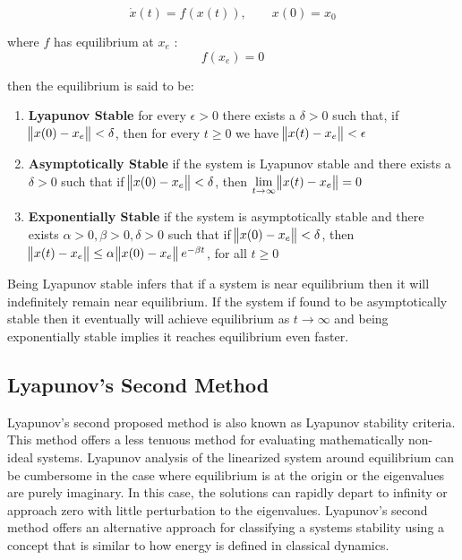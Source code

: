  \begin{equation}
\dot{x}(t)=f(x(t)), \qquad x(0)=x_0
\end{equation}

where $f$ has equilibrium at $x_e$ :
 \begin{equation}
f(x_e) = 0
\end{equation}

then the equilibrium is said to be:
\begin{enumerate}
	\item \textbf{Lyapunov Stable} \newline
	for every $\epsilon > 0$ there exists a $\delta > 0$ such that, if \: $\norm{x(0) - x_e} < \delta$, then for every $t \geq 0$ we have 	$ \norm{x(t) - x_e} < \epsilon$	
	\item \textbf{Asymptotically Stable} \newline
	if the system is Lyapunov stable and there exists a $\delta > 0$ such that if \: $\norm{x(0) - x_e}  < \delta$, then $\displaystyle \lim_{t\to \infty} \norm{x(t)-x_e} =0$
	\item \textbf{Exponentially Stable} \newline
	if the system is asymptotically stable and there exists $\alpha > 0, \beta > 0, \delta > 0$ such that if $\norm{x(0)-x_e}<\delta$, then \:$\norm{x(t)-x_e} \leq \alpha \norm{x(0)-x_e} e^{-\beta t}$, for all $t \geq 0$
\end{enumerate}

Being Lyapunov stable infers that if a system is near equilibrium then it will indefinitely remain near equilibrium.  If the system if found to be asymptotically stable then it eventually will achieve equilibrium as $t\to \infty$ and being exponentially stable implies it reaches equilibrium even faster.

\subsection{Lyapunov's Second Method}
 
Lyapunov's second proposed method is also known as Lyapunov stability criteria.  This method offers a less tenuous method for evaluating mathematically non-ideal systems.  Lyapunov analysis of the linearized system around equilibrium can be cumbersome in the case where equilibrium is at the origin or the eigenvalues are purely imaginary.  In this case, the solutions can rapidly depart to infinity or approach zero with little perturbation to the eigenvalues.  Lyapunov's second method offers an alternative approach for classifying a systems stability using a concept that is similar to how energy is defined in classical dynamics.

